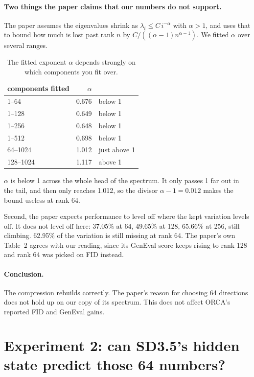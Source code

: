 \documentclass[11pt]{article}
\newcommand{\bad}[1]{\textcolor{red!70!black}{#1}}
\begin{document}
\paragraph{Two things the paper claims that our numbers do not support.}

The paper assumes the eigenvalues shrink as $\lambda_i \le C\,i^{-\alpha}$ with $\alpha > 1$, and
uses that to bound how much is lost past rank $n$ by $C/((\alpha-1)n^{\alpha-1})$. We fitted
$\alpha$ over several ranges.

\begin{table}[h]
\centering
\caption{The fitted exponent $\alpha$ depends strongly on which components you fit over.}
\begin{tabular}{@{}lrl@{}}
\toprule
components fitted & $\alpha$ & \\
\midrule
1--64   & 0.676 & \bad{below 1} \\
1--128  & 0.649 & \bad{below 1} \\
1--256  & 0.648 & \bad{below 1} \\
1--512  & 0.698 & \bad{below 1} \\
64--1024  & 1.012 & just above 1 \\
128--1024 & 1.117 & above 1 \\
\bottomrule
\end{tabular}
\end{table}

\noindent
$\alpha$ is below 1 across the whole head of the spectrum. It only passes 1 far out in the tail, and
then only reaches 1.012, so the divisor $\alpha - 1 = 0.012$ makes the bound useless at rank 64.

Second, the paper expects performance to level off where the kept variation levels off. It does not
level off here: 37.05\% at 64, 49.65\% at 128, 65.66\% at 256, still climbing. 62.95\% of the
variation is still missing at rank 64. The paper's own Table~2 agrees with our reading, since its
GenEval score keeps rising to rank 128 and rank 64 was picked on FID instead.

\paragraph{Conclusion.} The compression rebuilds correctly. The paper's reason for choosing 64
directions does not hold up on our copy of its spectrum. This does not affect ORCA's reported FID
and GenEval gains.

\section{Experiment 2: can SD3.5's hidden state predict those 64 numbers?}
\end{document}
